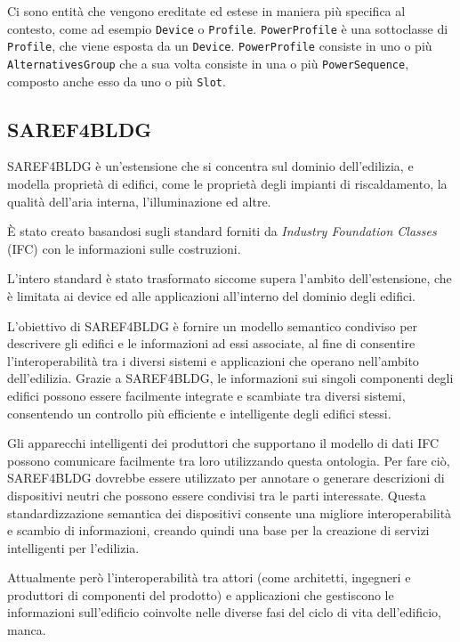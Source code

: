 Ci sono entità che vengono ereditate ed estese in maniera più specifica al
contesto, come ad esempio \texttt{Device} o \texttt{Profile}.
\texttt{PowerProfile} è una sottoclasse di \texttt{Profile}, che viene esposta
da un \texttt{Device}. \texttt{PowerProfile} consiste in uno o più
\texttt{AlternativesGroup} che a sua volta consiste in una o più
\texttt{PowerSequence}, composto anche esso da uno o più \texttt{Slot}.

\subsection{SAREF4BLDG}
SAREF4BLDG \cite{saref4bldg} è un'estensione che si concentra sul dominio
dell'edilizia,
e modella proprietà di edifici, come le proprietà degli impianti di
riscaldamento, la qualità dell'aria interna, l'illuminazione ed altre.

È stato creato basandosi sugli standard forniti da \textit{Industry Foundation
      Classes} (IFC) con le informazioni sulle costruzioni.

L'intero standard è stato trasformato siccome supera l'ambito dell'estensione,
che è limitata ai device ed alle applicazioni all'interno del dominio degli
edifici.

L'obiettivo di SAREF4BLDG è fornire un modello semantico condiviso per
descrivere gli edifici e le informazioni ad essi associate, al fine di
consentire l'interoperabilità tra i diversi sistemi e applicazioni che operano
nell'ambito dell'edilizia. Grazie a SAREF4BLDG, le informazioni sui singoli
componenti degli edifici possono essere facilmente integrate e scambiate tra
diversi sistemi, consentendo un controllo più efficiente e intelligente degli
edifici stessi.

Gli apparecchi intelligenti dei produttori che supportano il modello di dati
IFC possono comunicare facilmente tra loro utilizzando questa ontologia. Per
fare ciò, SAREF4BLDG dovrebbe essere utilizzato per annotare o generare
descrizioni di dispositivi neutri che possono essere condivisi tra le parti
interessate. Questa standardizzazione semantica dei dispositivi consente una
migliore interoperabilità e scambio di informazioni, creando quindi una base
per la creazione di servizi intelligenti per l'edilizia.

Attualmente però l'interoperabilità tra attori (come architetti, ingegneri e
produttori di componenti del prodotto) e applicazioni che gestiscono le
informazioni sull'edificio coinvolte nelle diverse fasi del ciclo di vita
dell'edificio, manca.

